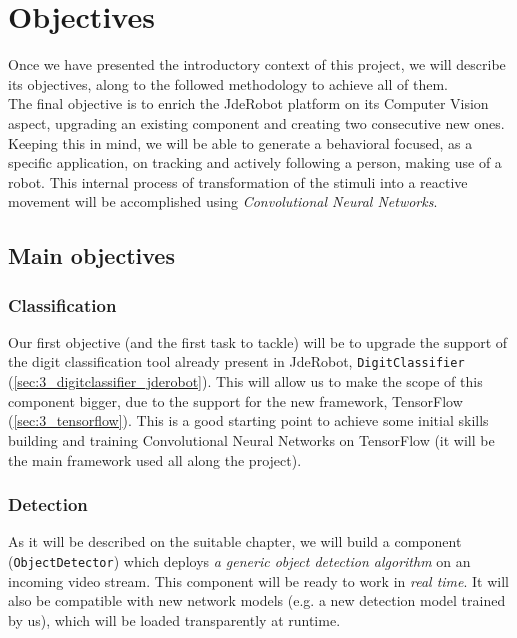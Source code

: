 \chapter{Objectives}
Once we have presented the introductory context of this project, we will describe its objectives, along to the followed methodology to achieve all of them.\\

The final objective is to enrich the JdeRobot platform on its Computer Vision aspect, upgrading an existing component and creating two consecutive new ones. Keeping this in mind, we will be able to generate a behavioral focused, as a specific application, on tracking and actively following a person, making use of a robot. This internal process of transformation of the stimuli into a reactive movement will be accomplished using \textit{Convolutional Neural Networks}.\\


\section{Main objectives}

		\subsection{Classification}
			Our first objective (and the first task to tackle) will be to upgrade the support of the digit classification tool already present in JdeRobot, \texttt{DigitClassifier} (\autoref{sec:3_digitclassifier_jderobot}). This will allow us to make the scope of this component bigger, due to the support for the new framework, TensorFlow (\autoref{sec:3_tensorflow}). This is a good starting point to achieve some initial skills building and training Convolutional Neural Networks on TensorFlow (it will be the main framework used all along the project).\\
		
		
		\subsection{Detection}
			As it will be described on the suitable chapter, we will build a component (\texttt{ObjectDetector}) which deploys \textit{a generic object detection algorithm} on an incoming video stream. This component will be ready to work in \emph{real time}. It will also be compatible with new network models (e.g. a new detection model trained by us), which will be loaded transparently at runtime.\\
			
